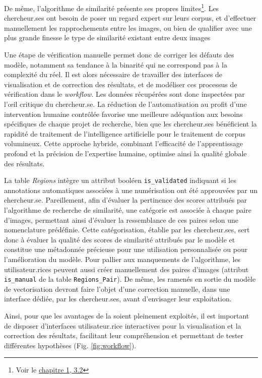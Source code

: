 De même, l'algorithme de similarité présente ses propres limites\footnote{Voir le \hyperlink{developpement-dune-interface-commune}{chapitre 1, 3.2}}. Les chercheur.ses ont besoin de poser un regard expert sur leurs corpus, et d'effectuer manuellement les rapprochements entre les images, ou bien de qualifier avec une plus grande finesse le type de similarité existant
entre deux images

Une étape de vérification manuelle permet donc de corriger les défauts
des modèle, notamment sa tendance à la binarité qui ne correspond pas à
la complexité du réel. Il est alors nécessaire de travailler des
interfaces de visualisation et de correction des résultats, et de
modéliser ces processus de vérification dans le \textit{workflow}. Les données
récupérées sont donc inspectées par l'œil critique du chercheur.se. La
réduction de l'automatisation au profit d'une intervention humaine
contrôlée favorise une meilleure adéquation aux besoins spécifiques de
chaque projet de recherche, bien que les chercheur.ses bénéficient la
rapidité de traitement de l'intelligence artificielle pour le traitement
de corpus volumineux. Cette approche hybride, combinant l'efficacité de
l'apprentissage profond et la précision de l'expertise humaine, optimise
ainsi la qualité globale des résultats.

La table \textit{Regions} intègre un attribut booléen \texttt{is\_validated} indiquant si
les annotations automatiques associées à une numérisation ont été
approuvées par un chercheur.se. Pareillement, afin d'évaluer la pertinence
des scores attribués par l'algorithme de recherche de similarité, une
catégorie est associée à chaque paire d'images, permettant ainsi d'évaluer la ressemblance de ces paires selon une nomenclature
prédéfinie. Cette catégorisation, établie par les chercheur.ses, sert donc
à évaluer la qualité des scores de similarité attribués par le modèle et
constitue une métadonnée précieuse pour une utilisation personnalisée ou
pour l'amélioration du modèle. Pour pallier aux manquements de
l'algorithme, les utilisateur.rices peuvent aussi créer
manuellement des paires d'images (attribut \texttt{is\_manual} de la table
\texttt{Regions\_Pair}). De même, les \svgs ramenés en sortie du modèle de
vectorisation devront faire l'objet d'une correction manuelle, dans une
interface dédiée, par les chercheur.ses, avant d'envisager leur
exploitation.

Ainsi, pour que les avantages de la \cv soient
pleinement exploités, il est important de disposer d'interfaces
utilisateur.rice interactives pour la visualisation et la correction des
résultats, facilitant leur compréhension et permettant de tester
différentes hypothèses (Fig. \ref{fig:workflow}).

